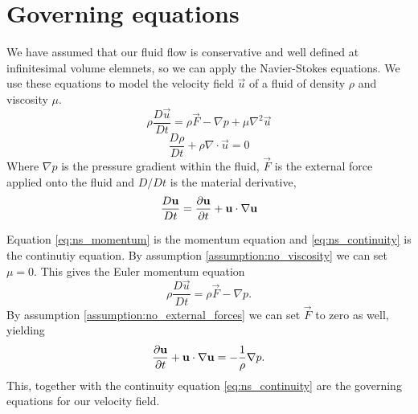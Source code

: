 \section{Governing equations}\label{ss:governing_eqs}
We have assumed that our fluid flow is conservative and well defined at infinitesimal volume elemnets, so we can apply the Navier-Stokes equations. We use these equations to model the velocity field $\vec{u}$ of a fluid of density $\rho$ and viscosity $\mu$.
%
%
\begin{equation}\label{eq:ns_momentum}
    \rho \frac{D \vec{u}}{D t} = \rho \vec{F} - \nabla p + \mu \nabla^2 \vec{u}
\end{equation}
\begin{equation}\label{eq:ns_continuity}
    \frac{D \rho}{D t} + \rho \nabla \cdot \vec{u} = 0
\end{equation}
Where $\nabla p$ is the pressure gradient within the fluid, $\vec{F}$ is the external force applied onto the fluid and $D/Dt$ is the material derivative,
  \[ \frac{D\mathbf{u}}{Dt} = \frac{\partial \mathbf{u}}{\partial t}+\mathbf{u}\cdot\nabla\mathbf{u}\] \par
%
Equation \eqref{eq:ns_momentum} is the momentum equation and \eqref{eq:ns_continuity} is the continutiy equation. By assumption \ref{assumption:no_viscosity} we can set $\mu = 0$. This gives the Euler momentum equation \parencite{shaughnessy05fluids}
\begin{equation}
    \rho \frac{D \vec{u}}{D t} = \rho \vec{F} - \nabla p.
\end{equation}
%
By assumption \ref{assumption:no_external_forces} we can set $\vec{F}$ to zero as well, yielding
    \begin{equation}\label{eq:euler_momentum}
        \frac{\partial \mathbf{u}}{\partial t} + \mathbf{u} \cdot \nabla\mathbf{u} = - \frac{1}{\rho}\nabla p.
    \end{equation}
%
This, together with the continuity equation \eqref{eq:ns_continuity} are the governing equations for our velocity field.
%
